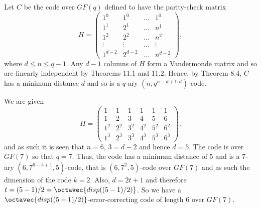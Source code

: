 Let $C$ be the code over $GF(q)$ defined to have the parity-check matrix
\[
H=
\begin{pmatrix}
1^0 & 1^0 & \ldots & 1^0 \\ 
1^1 & 2^1 & \ldots & n^1 \\ 
1^2 & 2^2 & \ldots & n^2 \\ 
\vdots & \vdots & \ldots & \vdots \\ 
1^{d-2} & 2^{d-2} & \ldots & n^{d-2}
\end{pmatrix},
\]
where $d \leq n \leq q-1$. Any $d-1$ columns of $H$ form a Vandermonde matrix and so are linearly independent by Theorems 11.1 and 11.2. Hence, by Theorem 8.4, $C$ has a minimum distance $d$ and so is a $q$-ary $(n, q^{n-d+1, d})$-code.

We are given 
\[
H=
\begin{pmatrix}
1 & 1 & 1 & 1 & 1 & 1 \\ 
1 & 2 & 3 & 4 & 5 & 6 \\ 
1^2 & 2^2 & 3^2 & 4^2 & 5^2 & 6^2 \\ 
1^3 & 2^3 & 3^3 & 4^3 & 5^3 & 6^3
\end{pmatrix}.
\]
and as such it is seen that $n=6$, $3 = d - 2$ and hence $d=5$. The code is over $GF(7)$ so that $q=7$. Thus, the code has a minimum distance of $5$ and is a $7$-ary $(6, 7^{6-5+1},5)$-code, that is $(6, 7^2,5)$-code over $GF(7)$ and as such the dimension of the code $k=2$. Also, $d = 2t + 1$ and therefore $t=(5 - 1)/2 =\octavec{disp((5-1)/2)}$. So we have a  $\octavec{disp((5-1)/2)}$-error-correcting code of length $6$ over $GF(7)$. 
